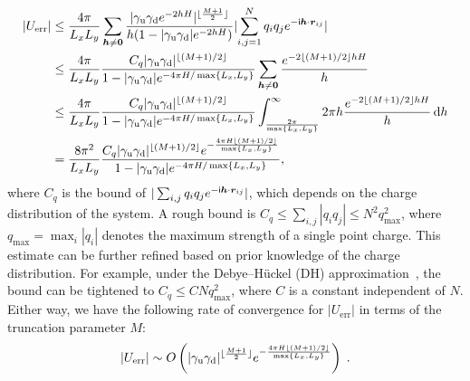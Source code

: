 \begin{equation}\label{eq:U_gamma_bound}
    \begin{split}
        \left|U_{\text{err}}\right| & \leq \frac{4 \pi}{L_x L_y}  \sum_{\bm{h}\neq \bm{0}}  \frac{\lvert\gamma_{\text{u}} \gamma_{\text{d}} e^{- 2 hH}\rvert^{\lfloor \frac{M + 1}{2} \rfloor}}{h(1 - \lvert\gamma_{\text{u}} \gamma_{\text{d}}\rvert e^{- 2hH})}\lvert\sum_{i,j=1}^{N}q_i q_j e^{-\mathsf i \bm{h}\cdot\bm{r}_{ij}}\rvert \\
        & \leq \frac{4\pi}{L_x L_y} \frac{C_{q} \lvert\gamma_{\text{u}} \gamma_{\text{d}}\rvert^{\lfloor{(M+1)/2}\rfloor}}{1 - \lvert\gamma_{\text{u}} \gamma_{\text{d}}\rvert e^{- 4\pi H / \max\{L_x,L_y\}}} \sum_{\bm{h}\neq \bm{0}} \frac{e^{- 2 \lfloor{(M+1)/2}\rfloor hH}}{h}\\
        & \leq \frac{4\pi}{L_x L_y} \frac{C_{q} \lvert\gamma_{\text{u}} \gamma_{\text{d}}\rvert^{\lfloor{(M+1)/2}\rfloor}}{1 - \lvert\gamma_{\text{u}} \gamma_{\text{d}}\rvert e^{- 4\pi H / \max\{L_x,L_y\}}} \int_{\frac{2\pi}{\max\{L_x,L_y\}}}^{\infty} 2\pi h \frac{e^{- 2 \lfloor{(M+1)/2}\rfloor hH}}{h} \, \mathrm{d}h \\
        & = \frac{8 \pi^2}{L_x L_y} \frac{C_{q} \lvert\gamma_{\text{u}} \gamma_{\text{d}}\rvert^{\lfloor{(M+1)/2}\rfloor} e^{-\frac{4 \pi H \lfloor{(M+1)/2}\rfloor}{\max\{L_x,L_y\}}}}{1 - \lvert\gamma_{\text{u}} \gamma_{\text{d}}\rvert e^{- 4\pi H / \max\{L_x,L_y\}}},
    \end{split}
\end{equation}
where $C_q$ is the bound of $|\sum_{i,j}q_iq_je^{-\mathsf i \bm{h}\cdot\bm{r}_{ij}}|$, which depends on the charge distribution of the system. 
A rough bound is $C_q\leq \sum_{i,j}|q_iq_j|\leq N^2q_{\text{max}}^2$, where $q_{\text{max}}=\max_{i}|q_i|$ denotes the maximum strength of a single point charge. 
This estimate can be further refined based on prior knowledge of the charge distribution. 
For example, under the Debye--H\"uckel (DH) approximation~\cite{levin2002electrostatic,gan2024fast}, the bound can be tightened to $C_q\leq CNq_{\max}^2$, where $C$ is a constant independent of $N$. 
Either way, we have the following rate of convergence for $|U_{\text{err}}|$ in terms of the truncation parameter $M$:
\begin{equation}\label{eq:Uerr}
|U_{\text{err}}|\sim O\left(\lvert\gamma_{\text{u}} \gamma_{\text{d}}\rvert^{\lfloor\frac{M+1}{2}\rfloor} e^{-\frac{4 \pi H \lfloor (M + 1)/2\rfloor}{\max\{L_x,L_y\}}}\right)\;.
\end{equation}

